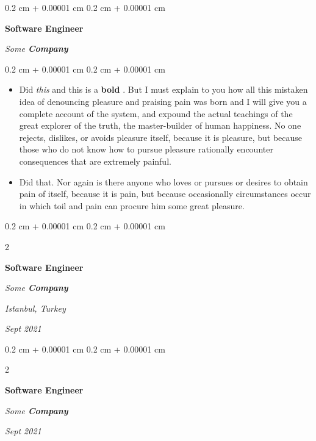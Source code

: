 \documentclass[10pt, letterpaper]{article}
\newenvironment{highlights}{
    \begin{itemize}[
        topsep=0.10 cm,
        parsep=0.10 cm,
        partopsep=0pt,
        itemsep=0pt,
        leftmargin=0.4 cm + 10pt
    ]
}{
    \end{itemize}
} %
\newenvironment{onecolentry}{
    \begin{adjustwidth}{
        0.2 cm + 0.00001 cm
    }{
        0.2 cm + 0.00001 cm
    }
}{
    \end{adjustwidth}
} %
\newenvironment{twocolentry}[2][]{
    \onecolentry
    \def\secondColumn{#2}
    \setcolumnwidth{\fill, 4.5 cm}
    \begin{paracol}{2}
}{
    \switchcolumn \raggedleft \secondColumn
    \end{paracol}
    \endonecolentry
} %
\let\hrefWithoutArrow\href
\renewcommand{\href}[2]{\hrefWithoutArrow{#1}{\ifthenelse{\equal{#2}{}}{ }{#2 }\raisebox{.15ex}{\footnotesize \faExternalLink*}}}
\begin{document}
        \begin{onecolentry}
            \textbf{Software Engineer}
            
            \textit{Some \textbf{Company}}
        \end{onecolentry}
        \vspace{0.10 cm}
        \begin{onecolentry}
            \begin{highlights}
                \item Did \textit{this} and this is a \textbf{bold} \href{https://example.com}{link}. But I must explain to you how all this mistaken idea of denouncing pleasure and praising pain was born and I will give you a complete account of the system, and expound the actual teachings of the great explorer of the truth, the master-builder of human happiness. No one rejects, dislikes, or avoids pleasure itself, because it is pleasure, but because those who do not know how to pursue pleasure rationally encounter consequences that are extremely painful.
                \item Did that. Nor again is there anyone who loves or pursues or desires to obtain pain of itself, because it is pain, but because occasionally circumstances occur in which toil and pain can procure him some great pleasure.
            \end{highlights}
        \end{onecolentry}


        \vspace{0.2 cm}

        \begin{twocolentry}{
        \textit{Istanbul, Turkey}    
            
        \textit{Sept 2021}}
            \textbf{Software Engineer}
            
            \textit{Some \textbf{Company}}
        \end{twocolentry}


        \vspace{0.2 cm}

        \begin{twocolentry}{
            
            
        \textit{Sept 2021}}
            \textbf{Software Engineer}
            
            \textit{Some \textbf{Company}}
        \end{twocolentry}


        \vspace{0.2 cm}
\end{document}
